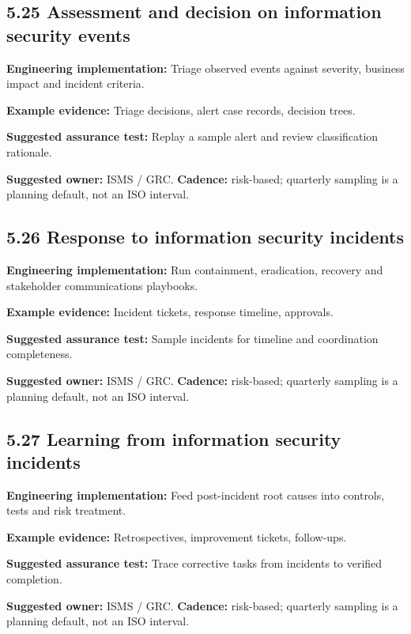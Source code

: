 \documentclass[11pt,letterpaper]{article}
\begin{document}
\subsection{5.25 Assessment and decision on information security events}
\textbf{Engineering implementation:} Triage observed events against severity, business impact and incident criteria.\par
\textbf{Example evidence:} Triage decisions, alert case records, decision trees.\par
\textbf{Suggested assurance test:} Replay a sample alert and review classification rationale.\par
\textbf{Suggested owner:} ISMS / GRC. \textbf{Cadence:} risk-based; quarterly sampling is a planning default, not an ISO interval.\par
{}
\subsection{5.26 Response to information security incidents}
\textbf{Engineering implementation:} Run containment, eradication, recovery and stakeholder communications playbooks.\par
\textbf{Example evidence:} Incident tickets, response timeline, approvals.\par
\textbf{Suggested assurance test:} Sample incidents for timeline and coordination completeness.\par
\textbf{Suggested owner:} ISMS / GRC. \textbf{Cadence:} risk-based; quarterly sampling is a planning default, not an ISO interval.\par
{}
\subsection{5.27 Learning from information security incidents}
\textbf{Engineering implementation:} Feed post-incident root causes into controls, tests and risk treatment.\par
\textbf{Example evidence:} Retrospectives, improvement tickets, follow-ups.\par
\textbf{Suggested assurance test:} Trace corrective tasks from incidents to verified completion.\par
\textbf{Suggested owner:} ISMS / GRC. \textbf{Cadence:} risk-based; quarterly sampling is a planning default, not an ISO interval.\par
{}
\end{document}
